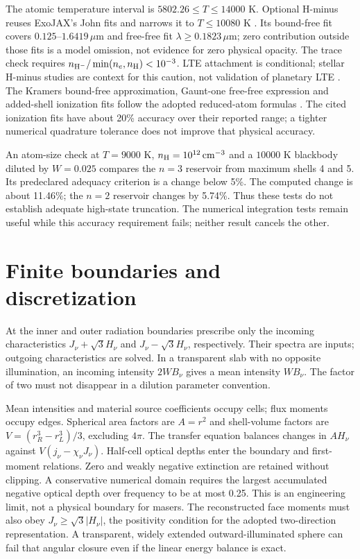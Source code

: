 \documentclass[11pt,a4paper]{article}
\begin{document}
The atomic temperature interval is $5802.26\le T\le14000$ K. Optional H-minus
reuses ExoJAX's John fits and narrows it to $T\le10080$ K \cite{john}.
Its bound-free fit covers $0.125$--$1.6419\,\mu$m and free-free fit
$\lambda\ge0.1823\,\mu$m; zero contribution outside those fits is a model
omission, not evidence for zero physical opacity. The trace check requires
$n_{\rm H^-}/\min(n_e,n_{\rm H})<10^{-3}$. LTE attachment is conditional;
stellar H-minus studies are context for this caution, not validation of
planetary LTE \cite{hminus}.
The Kramers bound-free approximation, Gaunt-one free-free expression and
added-shell ionization fits follow the adopted reduced-atom formulas
\cite{garcia}. The cited ionization fits have about 20\% accuracy over their
reported range; a tighter numerical quadrature tolerance does not improve
that physical accuracy.

An atom-size check at $T=9000$ K, $n_{\rm H}=10^{12}\,\mathrm{cm}^{-3}$ and
a $10000$ K blackbody diluted by $W=0.025$ compares the $n=3$ reservoir from
maximum shells 4 and 5. Its predeclared adequacy criterion is a change below
5\%. The computed change is about 11.46\%; the $n=2$ reservoir changes by
5.74\%. Thus these tests do not establish adequate high-state truncation.
The numerical integration tests remain useful while this accuracy requirement
fails; neither result cancels the other.

\section{Finite boundaries and discretization}
At the inner and outer radiation boundaries prescribe only the incoming
characteristics $J_\nu+\sqrt3H_\nu$ and $J_\nu-\sqrt3H_\nu$, respectively.
Their spectra are inputs; outgoing characteristics are solved. In a transparent
slab with no opposite illumination, an incoming intensity $2WB_\nu$ gives a
mean intensity $WB_\nu$. The factor of two must not disappear in a dilution
parameter convention.

Mean intensities and material source coefficients occupy cells; flux moments
occupy edges. Spherical area factors are $A=r^2$ and shell-volume factors are
$V=(r_R^3-r_L^3)/3$, excluding $4\pi$. The transfer equation balances changes
in $AH_\nu$ against $V(j_\nu-\chi_\nu J_\nu)$. Half-cell optical depths enter
the boundary and first-moment relations. Zero and weakly negative extinction
are retained without clipping. A conservative numerical domain requires the
largest accumulated negative optical depth over frequency to be at most 0.25.
This is an engineering limit, not a physical boundary for masers. The reconstructed
face moments must also obey $J_\nu\ge\sqrt3|H_\nu|$, the positivity condition
for the adopted two-direction representation. A transparent, widely extended
outward-illuminated sphere can fail that angular closure even if the linear
energy balance is exact.
\end{document}
